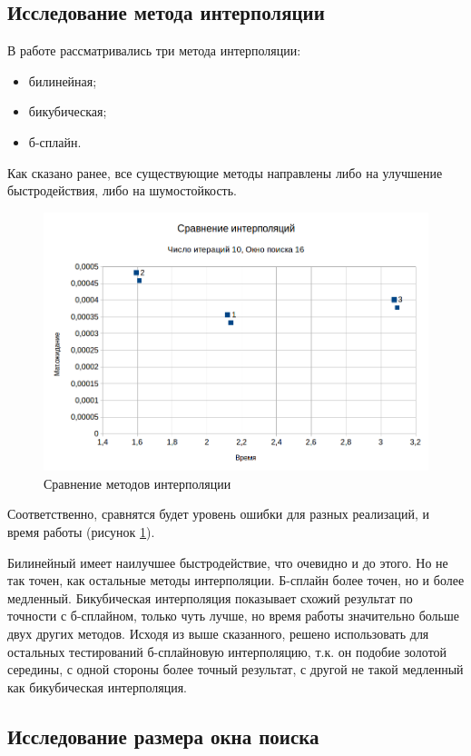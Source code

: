 \subsection{Исследование метода интерполяции}
В работе рассматривались три метода интерполяции:
\begin{itemize}
\item билинейная;
\item бикубическая;
\item б-сплайн.
\end{itemize}
Как сказано ранее, все существующие методы направлены либо на улучшение быстродействия, либо на шумостойкость. 
\begin{figure}
\centering
\includegraphics[width=0.8\linewidth]{images/inter_err}
\caption{Сравнение методов интерполяции}
\label{fig:inter_err}
\end{figure}
Соответственно, сравнятся будет уровень ошибки для разных реализаций, и время работы (рисунок \ref{fig:inter_err}).

Билинейный имеет наилучшее быстродействие, что очевидно и до этого. Но не так точен, как остальные методы интерполяции. Б-сплайн более точен, но и более медленный. Бикубическая интерполяция показывает схожий результат по точности с б-сплайном, только чуть лучше, но время работы значительно больше двух других методов. Исходя из выше сказанного, решено использовать для остальных тестирований б-сплайновую интерполяцию, т.к. он подобие золотой середины, с одной стороны более точный результат, с другой не такой медленный как бикубическая интерполяция. 
\subsection{Исследование размера окна поиска}

